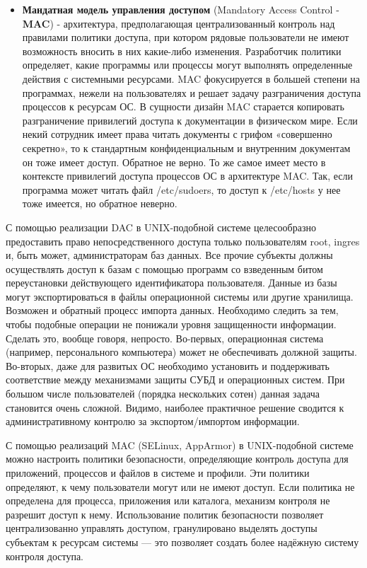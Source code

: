 \begin{itemize}
\begin{figure}[h]
\end{figure}
    \item \textbf{Мандатная модель управления доступом} (Mandatory Access Control - \textbf{MAC}) -
        архитектура, предполагающая централизованный контроль
        над правилами политики доступа, при котором рядовые пользователи не имеют возможность
        вносить в них какие-либо изменения. Разработчик политики определяет, какие программы или
        процессы могут выполнять определенные действия с системными ресурсами. MAC фокусируется в
        большей степени на программах, нежели на пользователях и решает задачу разграничения
        доступа процессов к ресурсам ОС.
        В сущности дизайн MAC старается копировать разграничение привилегий доступа к документации
        в физическом мире. Если некий сотрудник имеет права читать документы с грифом
        «совершенно секретно», то к стандартным конфиденциальным и внутренним документам
        он тоже имеет доступ. Обратное  не верно. То же самое имеет место в контексте привилегий
        доступа процессов ОС в архитектуре MAC. Так, если программа может читать файл /etc/sudoers,
        то доступ к /etc/hosts у нее тоже имеется, но обратное неверно.
\end{itemize}

С помощью реализации DAC в UNIX-подобной системе целесообразно предоставить право непосредственного доступа
только пользователям root, ingres и, быть может, администраторам баз данных. Все прочие
субъекты должны осуществлять доступ к базам с помощью программ со взведенным битом переустановки
действующего идентификатора пользователя.
Данные из базы могут экспортироваться в файлы операционной системы или другие хранилища. Возможен и
обратный процесс импорта данных. Необходимо следить за тем, чтобы подобные операции не понижали
уровня защищенности информации. Сделать это, вообще говоря, непросто. Во-первых, операционная
система (например, персонального компьютера) может не обеспечивать должной защиты. Во-вторых, даже
для развитых ОС необходимо установить и поддерживать соответствие между механизмами защиты СУБД и
операционных систем. При большом числе пользователей (порядка нескольких сотен) данная задача
становится очень сложной. Видимо, наиболее практичное решение сводится к административному контролю
за экспортом/импортом информации.

С помощью реализаций MAC (SELinux, AppArmor) в UNIX-подобной системе можно настроить политики безопасности,
определяющие контроль доступа для приложений, процессов и файлов в системе и профили. Эти политики
определяют, к чему пользователи могут или не имеют доступ. Если политика не определена для процесса,
приложения или каталога, механизм контроля не разрешит доступ к нему.
Использование политик безопасности позволяет централизованно управлять доступом, гранулировано
выделять доступы субъектам к ресурсам системы — это позволяет создать более надёжную систему
контроля доступа.

